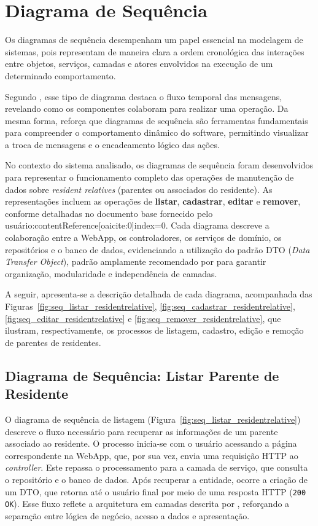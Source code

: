 \section{Diagrama de Sequência}

Os diagramas de sequência desempenham um papel essencial na modelagem de sistemas, pois representam de maneira clara a ordem cronológica das interações entre objetos, serviços, camadas e atores envolvidos na execução de um determinado comportamento.

Segundo \textcite{Sommerville2018ES10}, esse tipo de diagrama destaca o fluxo temporal das mensagens, revelando como os componentes colaboram para realizar uma operação. Da mesma forma, \textcite{Pressman2011ES7} reforça que diagramas de sequência são ferramentas fundamentais para compreender o comportamento dinâmico do software, permitindo visualizar a troca de mensagens e o encadeamento lógico das ações.

No contexto do sistema analisado, os diagramas de sequência foram desenvolvidos para representar o funcionamento completo das operações de manutenção de dados sobre \textit{resident relatives} (parentes ou associados do residente). As representações incluem as operações de \textbf{listar}, \textbf{cadastrar}, \textbf{editar} e \textbf{remover}, conforme detalhadas no documento base fornecido pelo usuário:contentReference[oaicite:0]{index=0}. Cada diagrama descreve a colaboração entre a WebApp, os controladores, os serviços de domínio, os repositórios e o banco de dados, evidenciando a utilização do padrão DTO (\textit{Data Transfer Object}), padrão amplamente recomendado por \textcite{Guedes2018} para garantir organização, modularidade e independência de camadas.

A seguir, apresenta-se a descrição detalhada de cada diagrama, acompanhada das
Figuras~\ref{fig:seq_listar_residentrelative},
\ref{fig:seq_cadastrar_residentrelative},
\ref{fig:seq_editar_residentrelative} e
\ref{fig:seq_remover_residentrelative}, que ilustram, respectivamente, os
processos de listagem, cadastro, edição e remoção de parentes de residentes.

\subsection{Diagrama de Sequência: Listar Parente de Residente}

O diagrama de sequência de listagem (Figura~\ref{fig:seq_listar_residentrelative})
descreve o fluxo necessário para recuperar as informações de um parente
associado ao residente. O processo inicia-se com o usuário acessando a página
correspondente na WebApp, que, por sua vez, envia uma requisição HTTP ao
\textit{controller}. Este repassa o processamento para a camada de serviço, que
consulta o repositório e o banco de dados. Após recuperar a entidade, ocorre a
criação de um DTO, que retorna até o usuário final por meio de uma resposta HTTP
(\texttt{200 OK}). Esse fluxo reflete a arquitetura em camadas descrita por
\textcite{Sommerville2018ES10}, reforçando a separação entre lógica de negócio, acesso
a dados e apresentação.

